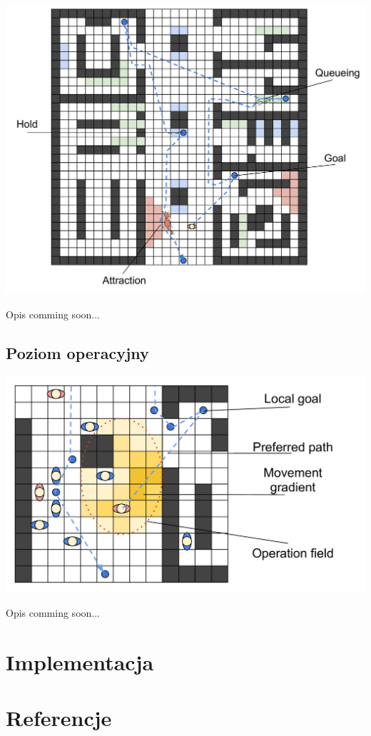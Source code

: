 \documentclass[a4paper]{article}
\begin{document}
        \begin{center}
            \includegraphics[scale=0.3]{./img/Tactical.pdf}
        \end{center}

\noindent
Opis comming soon...

        \subsection{Poziom operacyjny}
        \label{sec-2-2}

        \begin{center}
            \includegraphics[scale=0.3]{./img/Operative.pdf}
        \end{center}

\noindent
Opis comming soon...

\newpage
    \section{Implementacja}
    \label{sec-3}

\newpage
    \section{Referencje}
    \label{sec-4}

\end{document}
